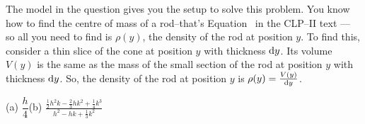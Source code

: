 \begin{hint}
The model in the question gives you the setup to solve this problem. You know how to find the centre of mass of a rod--that's
 Equation~ in the CLP--II text --- so all you need to find is $\rho(y)$, the density of the rod at position $y$. To find this, consider a thin slice of the cone at position $y$ with thickness $\mathrm{d}y$. Its volume $V(y)$ is the same as the mass of the small section of the rod at position $y$ with thickness $\mathrm{d}y$. So, the density of the rod at position $y$ is $\rho(y)=\frac{V(y)}{\mathrm{d}y}$.
\end{hint}
\begin{answer}
(a) $\dfrac{h}{4}$\qquad (b) $\displaystyle\frac{\frac{1}{2}h^2k - \frac{2}{3}hk^2+\frac{1}{4}k^3}{h^2-hk+\frac{1}{3}k^2}$
\end{answer}
